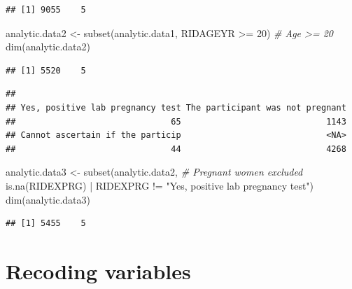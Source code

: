 \documentclass[
]{book}
\newenvironment{Shaded}{\begin{snugshade}}{\end{snugshade}}
\newcommand{\AttributeTok}[1]{\textcolor[rgb]{0.77,0.63,0.00}{#1}}
\newcommand{\CommentTok}[1]{\textcolor[rgb]{0.56,0.35,0.01}{\textit{#1}}}
\newcommand{\DecValTok}[1]{\textcolor[rgb]{0.00,0.00,0.81}{#1}}
\newcommand{\FunctionTok}[1]{\textcolor[rgb]{0.00,0.00,0.00}{#1}}
\newcommand{\NormalTok}[1]{#1}
\newcommand{\OtherTok}[1]{\textcolor[rgb]{0.56,0.35,0.01}{#1}}
\newcommand{\SpecialCharTok}[1]{\textcolor[rgb]{0.00,0.00,0.00}{#1}}
\newcommand{\StringTok}[1]{\textcolor[rgb]{0.31,0.60,0.02}{#1}}
\begin{document}
\begin{verbatim}
## [1] 9055    5
\end{verbatim}

\begin{Shaded}
\begin{Highlighting}[]
\NormalTok{analytic.data2 }\OtherTok{\textless{}{-}} \FunctionTok{subset}\NormalTok{(analytic.data1, RIDAGEYR }\SpecialCharTok{\textgreater{}=} \DecValTok{20}\NormalTok{) }\CommentTok{\# Age \textgreater{}= 20}
\FunctionTok{dim}\NormalTok{(analytic.data2)}
\end{Highlighting}
\end{Shaded}

\begin{verbatim}
## [1] 5520    5
\end{verbatim}

\begin{Shaded}
\end{Shaded}

\begin{verbatim}
## 
## Yes, positive lab pregnancy test The participant was not pregnant 
##                               65                             1143 
## Cannot ascertain if the particip                             <NA> 
##                               44                             4268
\end{verbatim}

\begin{Shaded}
\begin{Highlighting}[]
\NormalTok{analytic.data3 }\OtherTok{\textless{}{-}} \FunctionTok{subset}\NormalTok{(analytic.data2,  }\CommentTok{\# Pregnant women excluded}
                         \FunctionTok{is.na}\NormalTok{(RIDEXPRG) }\SpecialCharTok{|}\NormalTok{ RIDEXPRG }\SpecialCharTok{!=} 
                           \StringTok{"Yes, positive lab pregnancy test"}\NormalTok{)}
\FunctionTok{dim}\NormalTok{(analytic.data3)}
\end{Highlighting}
\end{Shaded}

\begin{verbatim}
## [1] 5455    5
\end{verbatim}

\hypertarget{recoding-variables}{%
\section{Recoding variables}\label{recoding-variables}}
\end{document}
